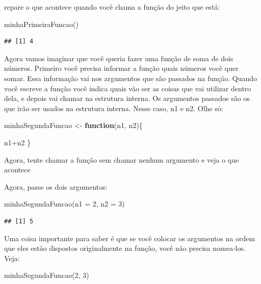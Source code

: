 \documentclass[
]{book}
\newenvironment{Shaded}{\begin{snugshade}}{\end{snugshade}}
\newcommand{\AttributeTok}[1]{\textcolor[rgb]{0.77,0.63,0.00}{#1}}
\newcommand{\ControlFlowTok}[1]{\textcolor[rgb]{0.13,0.29,0.53}{\textbf{#1}}}
\newcommand{\DecValTok}[1]{\textcolor[rgb]{0.00,0.00,0.81}{#1}}
\newcommand{\FunctionTok}[1]{\textcolor[rgb]{0.00,0.00,0.00}{#1}}
\newcommand{\NormalTok}[1]{#1}
\newcommand{\OtherTok}[1]{\textcolor[rgb]{0.56,0.35,0.01}{#1}}
\newcommand{\SpecialCharTok}[1]{\textcolor[rgb]{0.00,0.00,0.00}{#1}}
\begin{document}
repare o que acontece quando você chama a função do jeito que está:

\begin{Shaded}
\begin{Highlighting}[]
\FunctionTok{minhaPrimeiraFuncao}\NormalTok{()}
\end{Highlighting}
\end{Shaded}

\begin{verbatim}
## [1] 4
\end{verbatim}

Agora vamos imaginar que você queria fazer uma função de soma de dois números. Primeiro você precisa informar a função quais números você quer somar. Essa informação vai nos argumentos que são passados na função. Quando você escreve a função você indica quais vão ser as coisas que vai utilizar dentro dela, e depois vai chamar na estrutura interna. Os argumentos passados são os que irão ser usados na estrutura interna. Nesse caso, n1 e n2. Olhe só:

\begin{Shaded}
\begin{Highlighting}[]
\NormalTok{minhaSegundaFuncao }\OtherTok{\textless{}{-}} \ControlFlowTok{function}\NormalTok{(n1, n2)\{ }

\NormalTok{  n1}\SpecialCharTok{+}\NormalTok{n2}
\NormalTok{\}}
\end{Highlighting}
\end{Shaded}

Agora, tente chamar a função sem chamar nenhum argumento e veja o que acontece

Agora, passe os dois argumentos:

\begin{Shaded}
\begin{Highlighting}[]
\FunctionTok{minhaSegundaFuncao}\NormalTok{(}\AttributeTok{n1 =} \DecValTok{2}\NormalTok{, }\AttributeTok{n2 =} \DecValTok{3}\NormalTok{)}
\end{Highlighting}
\end{Shaded}

\begin{verbatim}
## [1] 5
\end{verbatim}

Uma coisa importante para saber é que se você colocar os argumentos na ordem que eles estão dispostos originalmente na função, você não precisa nomea-los. Veja:

\begin{Shaded}
\begin{Highlighting}[]
\FunctionTok{minhaSegundaFuncao}\NormalTok{(}\DecValTok{2}\NormalTok{, }\DecValTok{3}\NormalTok{)}
\end{Highlighting}
\end{Shaded}
\end{document}
